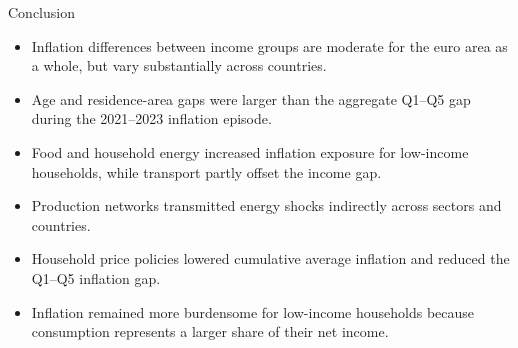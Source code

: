 \documentclass[10pt,aspectratio=169]{beamer}
\begin{document}
\begin{frame}{Conclusion}
\begin{itemize}
  \item Inflation differences between income groups are moderate for the euro area as a whole, but vary substantially across countries.
  \item Age and residence-area gaps were larger than the aggregate Q1--Q5 gap during the 2021--2023 inflation episode.
  \item Food and household energy increased inflation exposure for low-income households, while transport partly offset the income gap.
  \item Production networks transmitted energy shocks indirectly across sectors and countries.
  \item Household price policies lowered cumulative average inflation and reduced the Q1--Q5 inflation gap.
  \item Inflation remained more burdensome for low-income households because consumption represents a larger share of their net income.
\end{itemize}
\end{frame}
\end{document}
